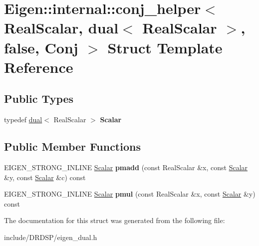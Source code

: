 \hypertarget{struct_eigen_1_1internal_1_1conj__helper_3_01_real_scalar_00_01dual_3_01_real_scalar_01_4_00_01false_00_01_conj_01_4}{\section{Eigen\-:\-:internal\-:\-:conj\-\_\-helper$<$ Real\-Scalar, dual$<$ Real\-Scalar $>$, false, Conj $>$ Struct Template Reference}
\label{struct_eigen_1_1internal_1_1conj__helper_3_01_real_scalar_00_01dual_3_01_real_scalar_01_4_00_01false_00_01_conj_01_4}
}
\subsection*{Public Types}
\begin{DoxyCompactItemize}
\item 
\hypertarget{struct_eigen_1_1internal_1_1conj__helper_3_01_real_scalar_00_01dual_3_01_real_scalar_01_4_00_01false_00_01_conj_01_4_a19dccf85fa01541503fd11e22768bf34}{typedef \hyperlink{struct_d_r_d_s_p_1_1dual}{dual}$<$ Real\-Scalar $>$ {\bfseries Scalar}}\label{struct_eigen_1_1internal_1_1conj__helper_3_01_real_scalar_00_01dual_3_01_real_scalar_01_4_00_01false_00_01_conj_01_4_a19dccf85fa01541503fd11e22768bf34}

\end{DoxyCompactItemize}
\subsection*{Public Member Functions}
\begin{DoxyCompactItemize}
\item 
\hypertarget{struct_eigen_1_1internal_1_1conj__helper_3_01_real_scalar_00_01dual_3_01_real_scalar_01_4_00_01false_00_01_conj_01_4_ae4f765f25459894453124feb2bf5cb0f}{E\-I\-G\-E\-N\-\_\-\-S\-T\-R\-O\-N\-G\-\_\-\-I\-N\-L\-I\-N\-E \hyperlink{struct_d_r_d_s_p_1_1dual}{Scalar} {\bfseries pmadd} (const Real\-Scalar \&x, const \hyperlink{struct_d_r_d_s_p_1_1dual}{Scalar} \&y, const \hyperlink{struct_d_r_d_s_p_1_1dual}{Scalar} \&c) const }\label{struct_eigen_1_1internal_1_1conj__helper_3_01_real_scalar_00_01dual_3_01_real_scalar_01_4_00_01false_00_01_conj_01_4_ae4f765f25459894453124feb2bf5cb0f}

\item 
\hypertarget{struct_eigen_1_1internal_1_1conj__helper_3_01_real_scalar_00_01dual_3_01_real_scalar_01_4_00_01false_00_01_conj_01_4_ab1f04107bc7cc2c8c79b2eca829710c1}{E\-I\-G\-E\-N\-\_\-\-S\-T\-R\-O\-N\-G\-\_\-\-I\-N\-L\-I\-N\-E \hyperlink{struct_d_r_d_s_p_1_1dual}{Scalar} {\bfseries pmul} (const Real\-Scalar \&x, const \hyperlink{struct_d_r_d_s_p_1_1dual}{Scalar} \&y) const }\label{struct_eigen_1_1internal_1_1conj__helper_3_01_real_scalar_00_01dual_3_01_real_scalar_01_4_00_01false_00_01_conj_01_4_ab1f04107bc7cc2c8c79b2eca829710c1}

\end{DoxyCompactItemize}


The documentation for this struct was generated from the following file\-:\begin{DoxyCompactItemize}
\item 
include/\-D\-R\-D\-S\-P/eigen\-\_\-dual.\-h\end{DoxyCompactItemize}
